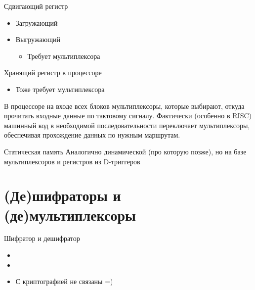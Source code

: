 \documentclass[xetex,aspectratio=43]{beamer}
\begin{document}
\begin{frame}{Сдвигающий регистр}
    \begin{itemize}
        \item
        Загружающий
        \item
        Выгружающий

        \begin{itemize}
            \item
            Требует мультиплексора
        \end{itemize}
    \end{itemize}
\end{frame}

\begin{frame}{Хранящий регистр в процессоре}
        \begin{itemize}
            \item
            Тоже требует мультиплексора
        \end{itemize}

        \pause

        В процессоре на входе всех блоков мультиплексоры, которые выбирают,
        откуда прочитать входные данные по тактовому сигналу. Фактически
        (особенно в RISC) машинный код в необходимой последовательности
        переключает мультиплексоры, обеспечивая прохождение данных по нужным
        маршрутам.
\end{frame}

\begin{frame}{Статическая память}
    Аналогично динамической (про которую позже), но на базе мультиплексоров и регистров из D-триггеров
\end{frame}

\section{(Де)шифраторы и (де)мультиплексоры}

\begin{frame}{Шифратор и дешифратор}
    \begin{itemize}
        \item
        \item
        \item
        С криптографией не связаны =)
    \end{itemize}
\end{frame}
\end{document}
